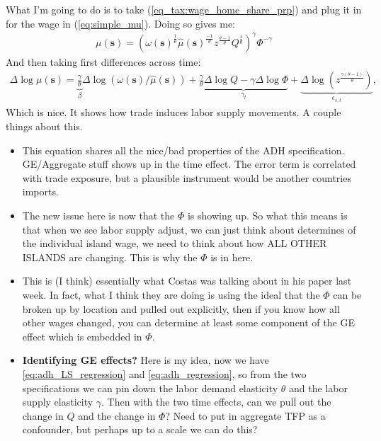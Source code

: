 \documentclass[pdftex,12pt]{article}
\begin{document}
\medskip
\noindent What I'm going to do is to take (\ref{eq_tax:wage_home_share_prp}) and plug it in for the wage in (\ref{eq:simple_mu}). Doing so gives me:
\begin{align}
\mu(\textbf{s}) = \left(\omega(\textbf{s})^{\frac{1}{\theta}} \hat \mu( \textbf{s})^{\frac{-1}{\theta}}z^{\frac{\theta-1}{\theta}} Q^{\frac{1}{\theta}} \right)^{\gamma} \Phi^{-\gamma}
\label{eq:simple_mu}
\end{align}
And then taking first differences across time:
\begin{align} 
\Delta \log \mu(\textbf{s}) = \underbrace{\frac{\gamma}{\theta}}_{\beta}\Delta \log \left( \omega(\textbf{s})/\hat \mu( \textbf{s})\right) +  \underbrace{\frac{\gamma}{\theta}\Delta \log Q - \gamma \Delta \log \Phi}_{\gamma_t} + \underbrace{\Delta \log \left(z^{\frac{\gamma (\theta-1)}{\theta}}\right)}_{\epsilon_{s,t}},
\label{eq:adh_LS_regression}
\end{align}
Which is nice. It shows how trade induces labor supply movements. A couple things about this. 
\begin{itemize}
\item This equation shares all the nice/bad properties of the ADH specification. GE/Aggregate stuff shows up in the time effect. The error term is correlated with trade exposure, but a plausible instrument would be another countries imports. 

\item The new issue here is now that the $\Phi$ is showing up. So what this means is that when we see labor supply adjust, we can just think about determines of the individual island wage, we need to think about how ALL OTHER ISLANDS are changing. This is why the $\Phi$ is in here.

\item This is (I think) essentially what Costas was talking about in his paper last week. In fact, what I think they are doing is using the ideal that the $\Phi$ can be broken up by location and pulled out explicitly, then if you know how all other wages changed, you can determine at least some component of the GE effect which is embedded in $\Phi$.
    
\item \textbf{Identifying GE effects?} Here is my idea, now we have \ref{eq:adh_LS_regression} and \ref{eq:adh_regression}, so from the two specifications we can pin down the labor demand elasticity $\theta$ and the labor supply elasticity $\gamma$. Then with the two time effects, can we pull out the change in $Q$ and the change in $\Phi$? Need to put in aggregate TFP as a confounder, but perhaps up to a scale we can do this?
\end{itemize}
\end{document}
